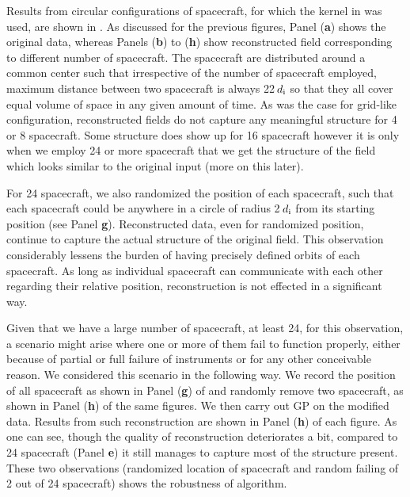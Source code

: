         Results from circular configurations of spacecraft, for which the kernel in
         was used, are shown in . As
        discussed for the previous figures, Panel (\textbf{a}) shows the original data, whereas
        Panels (\textbf{b}) to (\textbf{h}) show reconstructed field corresponding to different
        number of spacecraft. The spacecraft are distributed around a common center such that
        irrespective of the number of spacecraft employed, maximum distance between two spacecraft
        is always 22$\,d_{\rm i}$ so that they all cover equal volume of space in any given amount
        of time. As was the case for grid-like configuration, reconstructed fields do not capture
        any meaningful structure for 4 or 8 spacecraft. Some structure does show up for 16
        spacecraft however it is only when we employ 24 or more spacecraft that we get the structure
        of the field which looks similar to the original input (more on this later).

        For 24 spacecraft, we also randomized the position of each spacecraft, such that each
        spacecraft could be anywhere in a circle of radius 2$\,d_{\rm i}$ from its starting position
        (see Panel \textbf{g}). Reconstructed data, even for randomized position, continue to
        capture the actual structure of the original field. This observation considerably lessens
        the burden of having precisely defined orbits of each spacecraft. As long as individual
        spacecraft can communicate with each other regarding their relative position, reconstruction
        is not effected in a significant way.

        Given that we have a large number of spacecraft, at least 24, for this observation, a
        scenario might arise where one or more of them fail to function properly, either because of
        partial or full failure of instruments or for any other conceivable reason. We considered
        this scenario in the following way. We record the position of all spacecraft as shown in
        Panel (\textbf{g}) of  and randomly remove two spacecraft,
        as shown in Panel (\textbf{h}) of the same figures. We then carry out GP on the modified
        data. Results from such reconstruction are shown in Panel (\textbf{h}) of each figure. As
        one can see, though the quality of reconstruction deteriorates a bit, compared to 24
        spacecraft (Panel \textbf{e}) it still manages to capture most of the structure present.
        These two observations (randomized location of spacecraft and random failing of 2 out of 24
        spacecraft) shows the robustness of algorithm.


